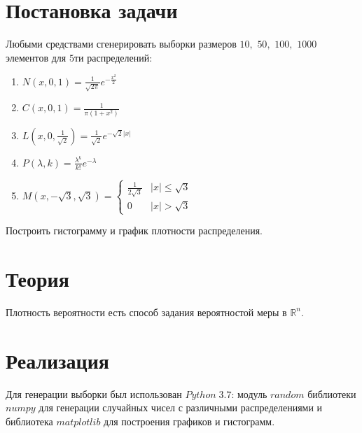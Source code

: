 \documentclass[a4]{article}
\begin{document}
\newpage
\pagestyle{plain}




\newpage
\tableofcontents{}
\newpage


\section{Постановка задачи}

Любыми средствами сгенерировать выборки размеров $10,$ $50,$ $100,$ $1000$ элементов для $5$ти распределений:

\begin{enumerate}

\item $N(x,0,1) = \frac{1}{\sqrt{2\pi}}e^{-\frac{x^2}{2}}$
\item $C(x,0,1) = \frac{1}{\pi(1+x^2)}$
\item $L\left( x,0,\frac{1}{\sqrt{2}}\right) = \frac{1}{\sqrt{2}}e^{-\sqrt{2}\vert x\vert}$
\item $P(\lambda,k) = \frac{\lambda^k}{k!}e^{-\lambda}$
\item  $
M(x,-\sqrt{3}, \sqrt{3}) = 
 \begin{cases}
   \frac{1}{2\sqrt{3}} &\vert x\vert \leqslant \sqrt{3}\\
   0 &\vert x\vert > \sqrt{3}
 \end{cases}
$
\end{enumerate}


Построить гистограмму и график плотности распределения.


\section{Теория}

Плотность вероятности есть способ задания вероятностой меры в $\mathbb{R}^n. $

\section{Реализация}
Для генерации выборки был использован $Python\;3.7$: модуль $random$ библиотеки $numpy$ для генерации случайных чисел с различными распределениями и библиотека $matplotlib$ для построения графиков и гистограмм.
\end{document}
